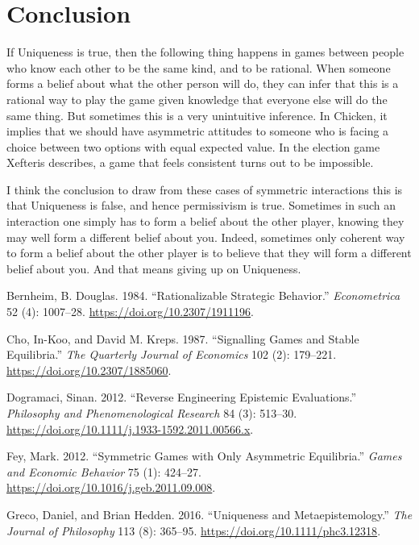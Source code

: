 \documentclass[12pt,]{article}
\begin{document}
\hypertarget{conclusion}{%
\section{Conclusion}\label{conclusion}}

If Uniqueness is true, then the following thing happens in games between people who know each other to be the same kind, and to be rational. When someone forms a belief about what the other person will do, they can infer that this is a rational way to play the game given knowledge that everyone else will do the same thing. But sometimes this is a very unintuitive inference. In Chicken, it implies that we should have asymmetric attitudes to someone who is facing a choice between two options with equal expected value. In the election game Xefteris describes, a game that feels consistent turns out to be impossible.

I think the conclusion to draw from these cases of symmetric interactions this is that Uniqueness is false, and hence permissivism is true. Sometimes in such an interaction one simply has to form a belief about the other player, knowing they may well form a different belief about you. Indeed, sometimes only coherent way to form a belief about the other player is to believe that they will form a different belief about you. And that means giving up on Uniqueness.

\hypertarget{refs}{}
\leavevmode\hypertarget{ref-Bernheim1984}{}%
Bernheim, B. Douglas. 1984. ``Rationalizable Strategic Behavior.'' \emph{Econometrica} 52 (4): 1007--28. \url{https://doi.org/10.2307/1911196}.

\leavevmode\hypertarget{ref-ChoKreps1987}{}%
Cho, In-Koo, and David M. Kreps. 1987. ``Signalling Games and Stable Equilibria.'' \emph{The Quarterly Journal of Economics} 102 (2): 179--221. \url{https://doi.org/10.2307/1885060}.

\leavevmode\hypertarget{ref-Dogramaci2012}{}%
Dogramaci, Sinan. 2012. ``Reverse Engineering Epistemic Evaluations.'' \emph{Philosophy and Phenomenological Research} 84 (3): 513--30. \url{https://doi.org/10.1111/j.1933-1592.2011.00566.x}.

\leavevmode\hypertarget{ref-Fey2012}{}%
Fey, Mark. 2012. ``Symmetric Games with Only Asymmetric Equilibria.'' \emph{Games and Economic Behavior} 75 (1): 424--27. \url{https://doi.org/10.1016/j.geb.2011.09.008}.

\leavevmode\hypertarget{ref-GrecoHedden2016}{}%
Greco, Daniel, and Brian Hedden. 2016. ``Uniqueness and Metaepistemology.'' \emph{The Journal of Philosophy} 113 (8): 365--95. \url{https://doi.org/10.1111/phc3.12318}.
\end{document}
